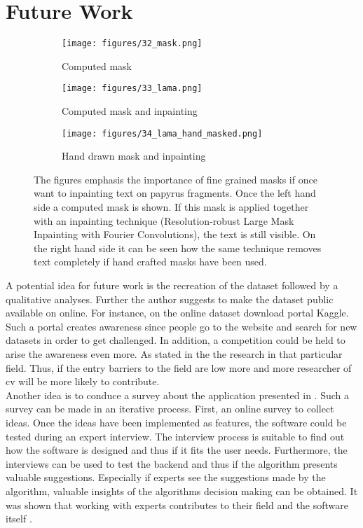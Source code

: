 \section{Future Work}
\label{sec:futurework}
\begin{figure}[t]
	\centering
	\begin{subfigure}{.32\textwidth}
		\centering
		\texttt{[image: figures/32\_mask.png]}
		\caption{Computed mask}
		\label{fig:mask}
	\end{subfigure}%
	\begin{subfigure}{.32\textwidth}
		\centering
		\texttt{[image: figures/33\_lama.png]}
		\caption{Computed mask and inpainting}
		\label{fig:lama_1}
	\end{subfigure}
	\begin{subfigure}{.32\textwidth}
		\centering
		\texttt{[image: figures/34\_lama\_hand\_masked.png]}
		\caption{Hand drawn mask and inpainting}
		\label{fig:lama_2}	
	\end{subfigure}
	\caption{The figures emphasis the importance of fine grained masks if once want to inpainting text on papyrus fragments. Once the left hand side a computed mask is shown. If this mask is applied together with an inpainting technique (Resolution-robust Large Mask Inpainting with Fourier Convolutions), the text is still visible. On the right hand side it can be seen how the same technique removes text completely if hand crafted masks have been used. }
	\label{fig:lama}
\end{figure}
%
A potential idea for future work is the recreation of the dataset followed by a qualitative analyses. Further the author suggests to make the dataset public available on online. For instance, on the online dataset download portal Kaggle. Such a portal creates awareness since people go to the website and search for new datasets in order to get challenged. In addition, a competition could be held to arise the awareness even more. As stated in the  the research in that particular field. Thus, if the entry barriers to the field are low more and more researcher of \ac{cv} will be more likely to contribute.\\

\noindent Another idea is to conduce a survey about the application presented in . Such a survey can be made in an iterative process. First, an online survey to collect ideas. Once the ideas have been implemented as features, the software could be tested during an expert interview. The interview process is suitable to find out how the software is designed and thus if it fits the user needs. Furthermore, the interviews can be used to test the backend and thus if the algorithm presents valuable suggestions. Especially if experts see the suggestions made by the algorithm, valuable insights of the algorithms decision making can be obtained. It was shown that working with experts contributes to their field and the software itself \cite{SilverHuangEtAl16nature}.\\

